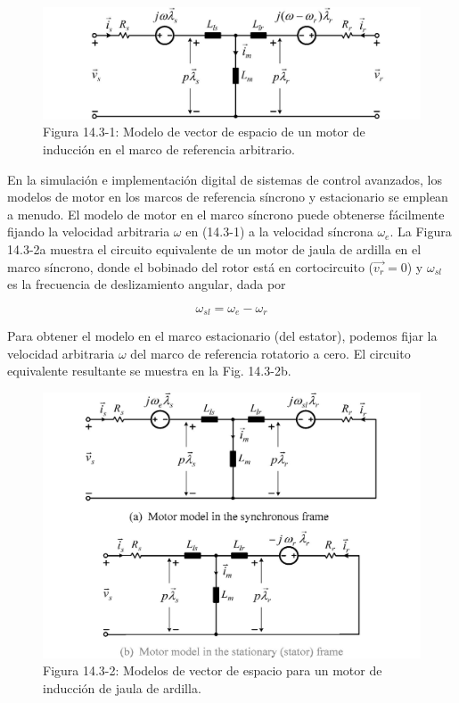 \documentclass[letterpaper,12pt]{article} %
\begin{document}
\begin{figure}[ht]
    \centering
    \includegraphics{graficos/img03.jpg} 
    \caption{Figura 14.3-1: Modelo de vector de espacio de un motor de inducción en el marco de referencia arbitrario.}
    \label{fig:14.3-1}
\end{figure}
\FloatBarrier

En la simulación e implementación digital de sistemas de control avanzados, los modelos de motor en los marcos de referencia síncrono y estacionario se emplean a menudo. El modelo de motor en el marco síncrono puede obtenerse fácilmente fijando la velocidad arbitraria \(\omega\) en (14.3-1) a la velocidad síncrona \(\omega_e\). La Figura 14.3-2a muestra el circuito equivalente de un motor de jaula de ardilla en el marco síncrono, donde el bobinado del rotor está en cortocircuito (\(\vec{v_r} = 0\)) y \(\omega_{sl}\) es la frecuencia de deslizamiento angular, dada por

\[
\omega_{sl} = \omega_e - \omega_r \tag{14.3-4}
\]

Para obtener el modelo en el marco estacionario (del estator), podemos fijar la velocidad arbitraria \(\omega\) del marco de referencia rotatorio a cero. El circuito equivalente resultante se muestra en la Fig. 14.3-2b.

\begin{figure}[ht]
    \centering
    \includegraphics{graficos/img04.jpg} 
    \caption{Figura 14.3-2: Modelos de vector de espacio para un motor de inducción de jaula de ardilla.}
    \label{fig:14.3-2}
\end{figure}
\FloatBarrier
\end{document}
